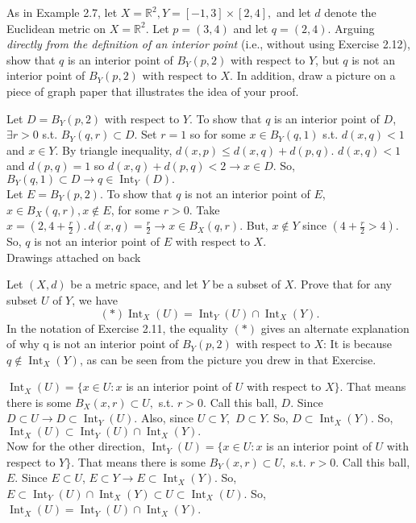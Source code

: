 \documentclass[12pt,letterpaper,boxed]{hmcpset}
\DeclareMathOperator{\Int}{Int}
\begin{document}
\begin{problem}[Exercise 2.11.]
As in Example 2.7, let $X = \mathbb{R}^{2}, Y = [-1,3]\times[2,4],$ and let $d$ denote the Euclidean metric on $X = \mathbb{R}^{2}.$ Let $p = (3,4)$ and let $q = (2, 4)$. Arguing \textit{directly from the definition of an interior point} (i.e., without using Exercise 2.12), show that $q$ is an interior point of $B_{Y}(p,2)$ with respect to $Y$, but $q$ is not an interior point of $B_{Y}(p,2)$ with respect to $X$. In addition, draw a picture on a piece of graph paper that illustrates the idea of your proof.
\end{problem}
\begin{solution}
Let $D=B_Y(p,2)$ with respect to $Y$. To show that $q$ is an interior point of $D$, $\exists r > 0$ s.t. $B_Y(q,r)\subset D$. Set $r = 1$ so for some $x \in B_Y(q,1)$ s.t. $d(x,q) < 1$ and $x \in Y.$ By triangle inequality, $d(x,p) \leq d(x, q) + d(p, q)$. $d(x, q) < 1$ and $d(p, q) = 1$ so $d(x, q) + d(p, q) < 2 \rightarrow x \in D.$ So, $B_Y(q,1) \subset D \rightarrow q \in \Int_Y(D).$ \\
Let $E=B_Y(p,2)$. To show that $q$ is not an interior point of $E$, $x \in B_X(q, r), x \notin E$, for some $r > 0$. Take $x = (2, 4 + \frac{r}{2}). \, d(x, q) = \frac{r}{2} \rightarrow x\in B_X(q, r).$ But, $x \notin Y$ since $(4 + \frac{r}{2} > 4).$ So, $q$ is not an interior point of $E$ with respect to $X.$\\
Drawings attached on back
\end{solution}


\begin{problem}[Exercise 2.12.]
Let $(X, d)$ be a metric space, and let $Y$ be a subset of $X$. Prove that for any subset $U$ of $Y$, we have $$(*) \Int_{X}(U) = \Int_{Y}(U)\cap\Int_{X}(Y).$$
In the notation of Exercise 2.11, the equality $(*)$ gives an alternate explanation of why q is not an interior point of $B_{Y}(p, 2)$ with respect to $X$: It is because $q \notin \Int_{X}(Y)$, as can be seen from the picture you drew in that Exercise.
\end{problem}
\begin{solution}
$\Int_{X}(U)=\{ x \in U : x$ is an interior point of $U$ with respect to $X \}$. That means there is some $B_X(x, r) \subset U,$ s.t. $r > 0.$ Call this ball, $D$. Since $D\subset U \rightarrow D \subset \Int_{Y}(U).$ Also, since $U\subset Y,$ $D\subset Y.$ So, $D \subset \Int_{X}(Y)$. So, $\Int_{X}(U) \subset \Int_{Y}(U)\cap\Int_{X}(Y).$\\
Now for the other direction, $\Int_{Y}(U)=\{ x \in U : x$ is an interior point of $U $ with respect to $Y \}.$ That means there is some $B_Y(x, r) \subset U,$ s.t. $r > 0.$ Call this ball, $E$. Since $E\subset U$, $E \subset Y \rightarrow E \subset \Int_{X}(Y).$ So, $E \subset \Int_{Y}(U)\cap\Int_{X}(Y)\subset U \subset \Int_{X}(U).$ So, $\Int_{X}(U) = \Int_{Y}(U)\cap\Int_{X}(Y)$.
\end{solution}
\end{document}
